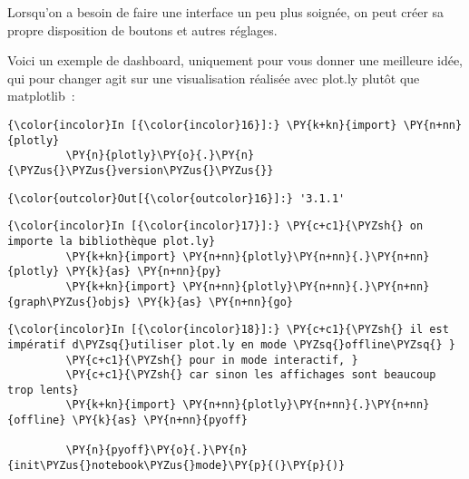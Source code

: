     Lorsqu'on a besoin de faire une interface un peu plus soignée, on peut
créer sa propre disposition de boutons et autres réglages.

    Voici un exemple de dashboard, uniquement pour vous donner une meilleure
idée, qui pour changer agit sur une visualisation réalisée avec plot.ly
plutôt que matplotlib~:

    \begin{Verbatim}[commandchars=\\\{\},frame=single,framerule=0.3mm,rulecolor=\color{cellframecolor}]
{\color{incolor}In [{\color{incolor}16}]:} \PY{k+kn}{import} \PY{n+nn}{plotly}
         \PY{n}{plotly}\PY{o}{.}\PY{n}{\PYZus{}\PYZus{}version\PYZus{}\PYZus{}}
\end{Verbatim}


\begin{Verbatim}[commandchars=\\\{\},frame=single,framerule=0.3mm,rulecolor=\color{cellframecolor}]
{\color{outcolor}Out[{\color{outcolor}16}]:} '3.1.1'
\end{Verbatim}
            
    \begin{Verbatim}[commandchars=\\\{\},frame=single,framerule=0.3mm,rulecolor=\color{cellframecolor}]
{\color{incolor}In [{\color{incolor}17}]:} \PY{c+c1}{\PYZsh{} on importe la bibliothèque plot.ly}
         \PY{k+kn}{import} \PY{n+nn}{plotly}\PY{n+nn}{.}\PY{n+nn}{plotly} \PY{k}{as} \PY{n+nn}{py}
         \PY{k+kn}{import} \PY{n+nn}{plotly}\PY{n+nn}{.}\PY{n+nn}{graph\PYZus{}objs} \PY{k}{as} \PY{n+nn}{go}
\end{Verbatim}


    \begin{Verbatim}[commandchars=\\\{\},frame=single,framerule=0.3mm,rulecolor=\color{cellframecolor}]
{\color{incolor}In [{\color{incolor}18}]:} \PY{c+c1}{\PYZsh{} il est impératif d\PYZsq{}utiliser plot.ly en mode \PYZsq{}offline\PYZsq{} }
         \PY{c+c1}{\PYZsh{} pour in mode interactif, }
         \PY{c+c1}{\PYZsh{} car sinon les affichages sont beaucoup trop lents}
         \PY{k+kn}{import} \PY{n+nn}{plotly}\PY{n+nn}{.}\PY{n+nn}{offline} \PY{k}{as} \PY{n+nn}{pyoff}
         
         \PY{n}{pyoff}\PY{o}{.}\PY{n}{init\PYZus{}notebook\PYZus{}mode}\PY{p}{(}\PY{p}{)}
\end{Verbatim}


    
    
